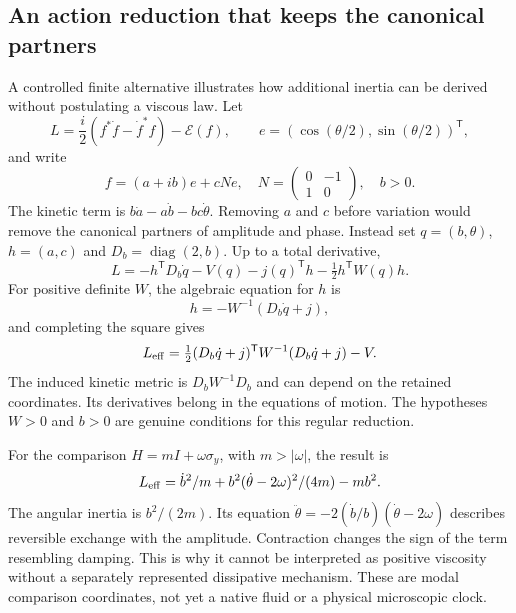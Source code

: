 \subsection{An action reduction that keeps the canonical partners}
A controlled finite alternative illustrates how additional inertia
can be derived without postulating a viscous law. Let
\begin{equation}
 L=\frac i2(f^*\dot f-\dot f^*f)-\mathcal E(f),\qquad
 e=(\cos(\theta/2),\sin(\theta/2))^{\mathsf T},
\end{equation}
and write
\begin{equation}
 f=(a+ib)e+cNe,\quad
 N=\begin{pmatrix}0&-1\\1&0\end{pmatrix},\quad b>0.
\end{equation}
The kinetic term is
$b\dot a-a\dot b-bc\dot\theta$. Removing $a$ and $c$ before
variation would remove the canonical partners of amplitude and
phase. Instead set $q=(b,\theta)$, $h=(a,c)$ and
$D_b=\operatorname{diag}(2,b)$. Up to a total derivative,
\begin{equation}
 L=-h^{\mathsf T}D_b\dot q-
       V(q)-j(q)^{\mathsf T}h-\tfrac12h^{\mathsf T}W(q)h.
\end{equation}
For positive definite $W$, the algebraic equation for $h$ is
\begin{equation}
 h=-W^{-1}(D_b\dot q+j),
\end{equation}
and completing the square gives
\begin{equation}
 L_{\rm eff}=\tfrac12(D_b\dot q+j)^{\mathsf T}
                    W^{-1}(D_b\dot q+j)-V.
\end{equation}
The induced kinetic metric is $D_bW^{-1}D_b$ and can depend on
the retained coordinates. Its derivatives belong in the equations
of motion. The hypotheses $W>0$ and $b>0$ are genuine conditions
for this regular reduction.

For the comparison $H=mI+\omega\sigma_y$, with $m>|\omega|$,
the result is
\begin{equation}
 L_{\rm eff}=\dot b^2/m+
       b^2(\dot\theta-2\omega)^2/(4m)-mb^2.
\end{equation}
The angular inertia is $b^2/(2m)$. Its equation
$\ddot\theta=-2(\dot b/b)(\dot\theta-2\omega)$ describes
reversible exchange with the amplitude. Contraction changes the sign
of the term resembling damping. This is why it cannot be interpreted
as positive viscosity without a separately represented dissipative
mechanism. These are modal comparison coordinates, not yet a native
fluid or a physical microscopic clock.

